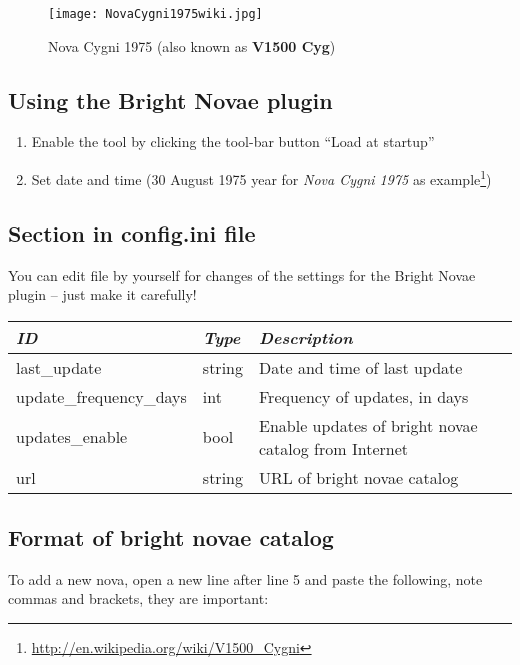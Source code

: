 
\begin{figure}[h]
\texttt{[image: NovaCygni1975wiki.jpg]}
\label{fig:NovaCygni1975}
\caption{Nova Cygni 1975 (also known as \textbf{V1500 Cyg})}
\end{figure}

\subsection{Using the Bright Novae plugin}
\label{sec:plugins:BrighrNovae:using}

\begin{enumerate}
\item Enable the tool by clicking the tool-bar button ``Load at startup''
\item Set date and time (30 August 1975 year for \emph{Nova Cygni 1975} as example\footnote{\url{http://en.wikipedia.org/wiki/V1500_Cygni}})
\end{enumerate}

\subsection{Section  in config.ini file}
\label{sec:plugins:BrightNovae:config}

You can edit  file by yourself for changes of the
settings for the Bright Novae plugin -- just make it carefully!

\begin{longtabu} to \textwidth {l|l|X}
\toprule
\emph{ID} & \emph{Type} & \emph{Description}\tabularnewline
\midrule
last\_update & string & Date and time of last update\tabularnewline
\midrule
update\_frequency\_days & int & Frequency of updates, in days\tabularnewline
\midrule
updates\_enable & bool & Enable updates of bright novae catalog from Internet \tabularnewline
\midrule
url & string & URL of bright novae catalog \tabularnewline
\bottomrule
\end{longtabu}

\subsection{Format of bright novae catalog}
\label{sec:plugins:BrightNovae:format}

To add a new nova, open a new line after line 5 and paste the following, note commas and brackets, they are important:

